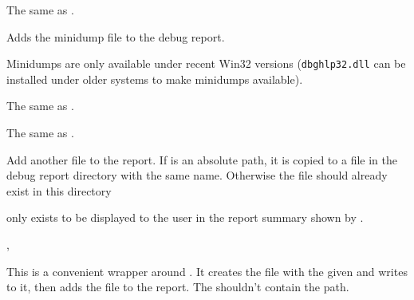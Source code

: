 
The same as .


\label{wxdebugreportadddump}


Adds the minidump file to the debug report.

Minidumps are only available under recent Win32 versions (\texttt{dbghlp32.dll} 
can be installed under older systems to make minidumps available).


\label{wxdebugreportaddexceptioncontext}


The same as .


\label{wxdebugreportaddexceptiondump}


The same as .


\label{wxdebugreportaddfile}


Add another file to the report. If  is an absolute path, it is
copied to a file in the debug report directory with the same name. Otherwise
the file should already exist in this directory

 only exists to be displayed to the user in the report summary
shown by .


,\\


\label{wxdebugreportaddtext}


This is a convenient wrapper around . It
creates the file with the given  and writes  to it, then
adds the file to the report. The  shouldn't contain the path.

